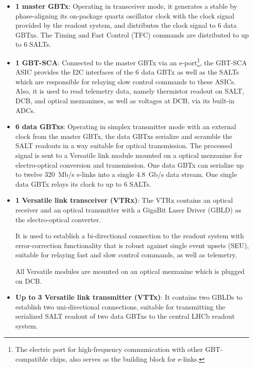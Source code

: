 \begin{itemize}
    \item \textbf{1 master GBTx}:
        Operating in transceiver mode,
        it generates a stable by phase-aligning its on-package quartz oscillator
        clock with the clock signal provided by the readout system,
        and distributes the clock signal to 6 data GBTxs.
        The Timing and Fast Control (TFC) commands are distributed to up to 6
        SALTs.

    \item \textbf{1 GBT-SCA}:
        Connected to the master GBTx via an e-port\footnote{
            The electric port for high-frequency communication with other
            GBT-compatible chips,
            also serves as the building block for e-links.
        },
        the GBT-SCA ASIC provides the I2C interfaces
        of the 6 data GBTx as well as the SALTs which are
        responsible for relaying slow control commands to these ASICs.
        Also, it is used to read telemetry data,
        namely thermistor readout on SALT, DCB, and optical mezzanines,
        as well as voltages at DCB,
        via its built-in ADCs.

    \item \textbf{6 data GBTxs}:
        Operating in simplex transmitter mode with an external clock from the
        master GBTx,
        the data GBTxs serialize and scramble the SALT readouts in a way
        suitable for optical transmission.
        The processed signal is sent to a Versatile link module mounted on
        a optical mezzanine for electro-optical conversion and transmission.
        One data GBTx can serialize up to twelve 320~Mb/s e-links into a single
        4.8~Gb/s data stream.
        One single data GBTx relays its clock to up to 6 SALTs.

    \item \textbf{1 Versatile link transceiver (VTRx)}:
        The VTRx contains an optical receiver and an optical transmitter with a
        GigaBit Laser Driver (GBLD) as the electro-optical converter.

        It is used to establish a bi-directional connection to the readout
        system with error-correction functionality that is robust against single
        event upsets (SEU),
        suitable for relaying fast and slow control commands, as well as
        telemetry.

        All Versatile modules are mounted on an optical mezzanine which is
        plugged on DCB.

    \item \textbf{Up to 3 Versatile link transmitter (VTTx)}:
        It contains two GBLDs to establish two uni-directional connections,
        suitable for transmitting the serialized SALT readout of two data GBTxs
        to the central LHCb readout system.
\end{itemize}

